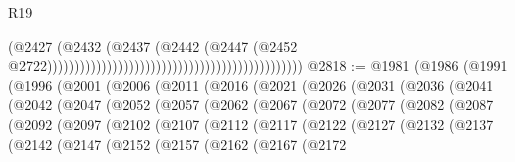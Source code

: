 \begin{lexlean}{R19}
\begin{coremodule}
                                                                                      (@2427
                                                                                        (@2432
                                                                                          (@2437
                                                                                            (@2442
                                                                                              (@2447
                                                                                                (@2452
                                                                                                  @2722)))))))))))))))))))))))))))))))))))))))))))))))
@2818 := @1981
    (@1986
      (@1991
        (@1996
          (@2001
            (@2006
              (@2011
                (@2016
                  (@2021
                    (@2026
                      (@2031
                        (@2036
                          (@2041
                            (@2042
                              (@2047
                                (@2052
                                  (@2057
                                    (@2062
                                      (@2067
                                        (@2072
                                          (@2077
                                            (@2082
                                              (@2087
                                                (@2092
                                                  (@2097
                                                    (@2102
                                                      (@2107
                                                        (@2112
                                                          (@2117
                                                            (@2122
                                                              (@2127
                                                                (@2132
                                                                  (@2137
                                                                    (@2142
                                                                      (@2147
                                                                        (@2152
                                                                          (@2157
                                                                            (@2162
                                                                              (@2167
                                                                                (@2172

\end{coremodule}
\end{lexlean}
